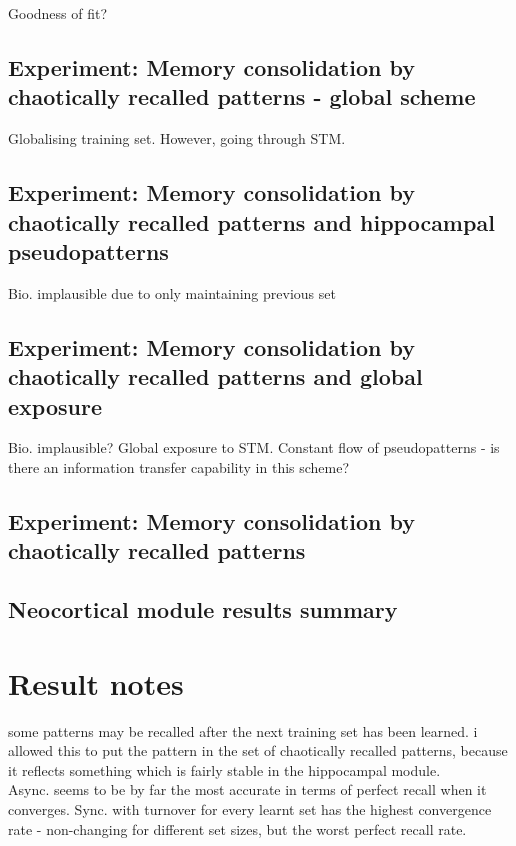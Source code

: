 Goodness of fit?

\subsection{Experiment: Memory consolidation by chaotically recalled patterns - global scheme}

Globalising training set. However, going through STM.


\subsection{Experiment: Memory consolidation by chaotically recalled patterns and hippocampal pseudopatterns}

Bio. implausible due to only maintaining previous set

\subsection{Experiment: Memory consolidation by chaotically recalled patterns and global exposure}

Bio. implausible? Global exposure to STM. Constant flow of pseudopatterns - is there an information transfer capability in this scheme?

\subsection{Experiment: Memory consolidation by chaotically recalled patterns}

\subsection{Neocortical module results summary}


\section*{Result notes}


some patterns may be recalled after the next training set has been learned. i allowed this to put the pattern in the set of chaotically recalled patterns, because it reflects something which is fairly stable in the hippocampal module.
\\

Async. seems to be by far the most accurate in terms of perfect recall when it converges. Sync. with turnover for every learnt set has the highest convergence rate - non-changing for different set sizes, but the worst perfect recall rate.

